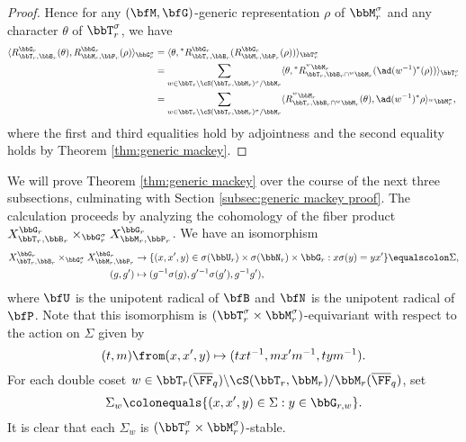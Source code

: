 \begin{proof}
  Hence for any $(\bfM,\bfG)$-generic representation $\rho$ of $\bbM_r^\sigma$ and any character $\theta$ of $\bbT_r^\sigma$, we have
  \begin{align*}
    \langle R_{\bbT_r,\bbB_r}^{\bbG_r}(\theta), R_{\bbM_r,\bbP_r}^{\bbG_r}(\rho) \rangle_{\bbG_r^\sigma} 
    &= \langle \theta, {}^* R_{\bbT_r,\bbB_r}^{\bbG_r}(R_{\bbM_r,\bbP_r}^{\bbG_r}(\rho)) \rangle_{\bbT_r^\sigma} \\
    &= \sum_{w \in \bbT_r \backslash \cS(\bbT_r, \bbM_r)^\sigma/\bbM_r}\langle \theta, {}^* R_{\bbT_r,\bbB_r \cap {}^w \bbM_r}^{{}^w \bbM_r}(\ad(w^{-1})^*(\rho)) \rangle_{\bbT_r^\sigma} \\
    &= \sum_{w \in \bbT_r \backslash \cS(\bbT_r, \bbM_r)^\sigma/\bbM_r} \langle R_{\bbT_r, \bbB_r \cap {}^w \bbM_r}^{{}^w \bbM_r}(\theta), \ad(w^{-1})^* \rho \rangle_{{}^w \bbM_r^\sigma},
  \end{align*}
  where the first and third equalities hold by adjointness and the second equality holds by Theorem \ref{thm:generic mackey}.
\end{proof}

We will prove Theorem \ref{thm:generic mackey} over the course of the next three subsections, culminating with Section \ref{subsec:generic mackey proof}. The calculation proceeds by analyzing the cohomology of the fiber product $X_{\bbT_r, \bbB_r}^{\bbG_r} \times_{\bbG_r^\sigma} X_{\bbM_r, \bbP_r}^{\bbG_r}$. We have an isomorphism
\begin{align*}
  X_{\bbT_r, \bbB_r}^{\bbG_r} \times_{\bbG_r^\sigma} X_{\bbM_r, \bbP_r}^{\bbG_r} &\to \{(x,x',y) \in \sigma(\bbU_r) \times \sigma(\bbN_r) \times \bbG_r : x \sigma(y) = yx'\} \equalscolon \Sigma, \\
  (g,g') &\mapsto (g^{-1}\sigma(g), g'{}^{-1}\sigma(g'), g^{-1} g'), 
\end{align*}
where $\bfU$ is the unipotent radical of $\bfB$ and $\bfN$ is the unipotent radical of $\bfP$. Note that this isomorphism is $(\bbT_r^\sigma \times \bbM_r^\sigma)$-equivariant with respect to the action on $\Sigma$ given by
\begin{equation*}
  (t,m) \from (x,x',y) \mapsto (txt^{-1}, mx'm^{-1}, tym^{-1}).
\end{equation*}
For each double coset $w \in \bbT_r(\overline \FF_q) \backslash \cS(\bbT_r, \bbM_r)/\bbM_r(\overline \FF_q)$, set
\begin{equation*}
  \Sigma_w \colonequals \{(x,x',y) \in \Sigma : y \in \bbG_{r,w}\}.
\end{equation*}
It is clear that each $\Sigma_w$ is $(\bbT_r^\sigma \times \bbM_r^\sigma)$-stable.



